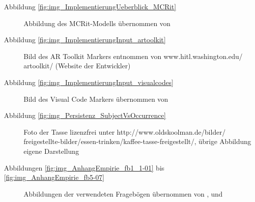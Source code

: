 \begin{description}
 \item[Abbildung \ref{fig:img_ImplementierungUeberblick_MCRit}] Abbildung des MCRit-Modells übernommen von \citep{Ishii08}
 \item[Abbildung \ref{fig:img_ImplementierungInput_artoolkit}] Bild des AR Toolkit Markers entnommen von www.hitl.washington.edu/ artoolkit/ (Website der Entwickler)
 \item[Abbildung \ref{fig:img_ImplementierungInput_visualcodes}] Bild des Visual Code Markers übernommen von \citep{Rohs04}
 \item[Abbildung \ref{fig:img_Persistenz_SubjectVsOccurrence}] Foto der Tasse lizenzfrei unter http://www.oldskoolman.de/bilder/\\freigestellte-bilder/essen-trinken/kaffee-tasse-freigestellt/, übrige Abbildung eigene Darstellung
 \item[Abbildungen \ref{fig:img_AnhangEmpirie_fb1_1-01} bis \ref{fig:img_AnhangEmpirie_fb5-07}] Abbildungen der verwendeten Fragebögen übernommen von \citep{Bohninger10}, \citep{Wahlmuller10} und \citep{Bindreiter10}
\end{description}
